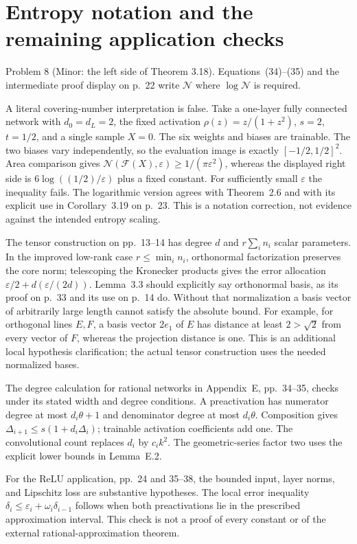 \documentclass[10pt]{article}
\begin{document}
\section*{Entropy notation and the remaining application checks}
Problem 8 (Minor: the left side of Theorem 3.18).  Equations (34)–(35) and the intermediate proof display on p. 22 write \(\mathcal N\) where \(\log\mathcal N\) is required.\par
A literal covering-number interpretation is false. Take a one-layer fully connected network with \(d_0=d_L=2\), the fixed activation \(\rho(z)=z/(1+z^2)\), \(s=2\), \(t=1/2\), and a single sample \(X=0\). The six weights and biases are trainable. The two biases vary independently, so the evaluation image is exactly \([-1/2,1/2]^2\). Area comparison gives \(\mathcal N(\mathcal F(X),\varepsilon)\ge1/(\pi\varepsilon^2)\), whereas the displayed right side is \(6\log((1/2)/\varepsilon)\) plus a fixed constant. For sufficiently small \(\varepsilon\) the inequality fails. The logarithmic version agrees with Theorem 2.6 and with its explicit use in Corollary 3.19 on p. 23. This is a notation correction, not evidence against the intended entropy scaling.\par
The tensor construction on pp. 13–14 has degree \(d\) and \(r\sum_i n_i\) scalar parameters. In the improved low-rank case \(r\le\min_i n_i\), orthonormal factorization preserves the core norm; telescoping the Kronecker products gives the error allocation \(\varepsilon/2+d(\varepsilon/(2d))\). Lemma 3.3 should explicitly say orthonormal basis, as its proof on p. 33 and its use on p. 14 do. Without that normalization a basis vector of arbitrarily large length cannot satisfy the absolute bound. For example, for orthogonal lines \(E,F\), a basis vector \(2e_1\) of \(E\) has distance at least \(2>\sqrt2\) from every vector of \(F\), whereas the projection distance is one. This is an additional local hypothesis clarification; the actual tensor construction uses the needed normalized bases.\par
The degree calculation for rational networks in Appendix E, pp. 34–35, checks under its stated width and degree conditions. A preactivation has numerator degree at most \(d_i\theta+1\) and denominator degree at most \(d_i\theta\). Composition gives \(\Delta_{i+1}\le s(1+d_i\Delta_i)\); trainable activation coefficients add one. The convolutional count replaces \(d_i\) by \(c_i k^2\). The geometric-series factor two uses the explicit lower bounds in Lemma E.2.\par
For the ReLU application, pp. 24 and 35–38, the bounded input, layer norms, and Lipschitz loss are substantive hypotheses. The local error inequality \(\delta_i\le\varepsilon_i+\omega_i\delta_{i-1}\) follows when both preactivations lie in the prescribed approximation interval. This check is not a proof of every constant or of the external rational-approximation theorem.\par
\end{document}
